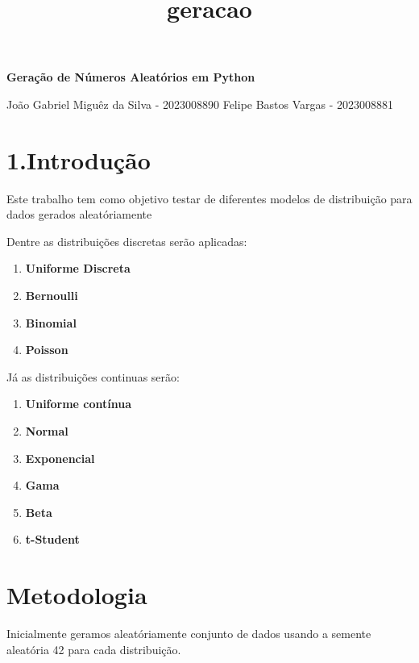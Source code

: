 \documentclass[11pt]{article}
\title{geracao}
\providecommand{\tightlist}{%
      \setlength{\itemsep}{0pt}\setlength{\parskip}{0pt}}
\begin{document}
    
    \maketitle
    
    

    
    \textbf{Geração de Números Aleatórios em Python}

João Gabriel Miguêz da Silva - 2023008890 Felipe Bastos Vargas -
2023008881

\hypertarget{introduuxe7uxe3o}{%
\section{1.Introdução}\label{introduuxe7uxe3o}}

Este trabalho tem como objetivo testar de diferentes modelos de
distribuição para dados gerados aleatóriamente

Dentre as distribuições discretas serão aplicadas:

\begin{enumerate}
\def\labelenumi{\arabic{enumi}.}
\tightlist
\item
  \textbf{Uniforme Discreta}
\item
  \textbf{Bernoulli}
\item
  \textbf{Binomial}
\item
  \textbf{Poisson}
\end{enumerate}

Já as distribuições continuas serão:

\begin{enumerate}
\def\labelenumi{\arabic{enumi}.}
\tightlist
\item
  \textbf{Uniforme contínua}
\item
  \textbf{Normal}
\item
  \textbf{Exponencial}
\item
  \textbf{Gama}
\item
  \textbf{Beta}
\item
  \textbf{t-Student}
\end{enumerate}

    \hypertarget{metodologia}{%
\section{Metodologia}\label{metodologia}}

Inicialmente geramos aleatóriamente conjunto de dados usando a semente
aleatória 42 para cada distribuição.
\end{document}
